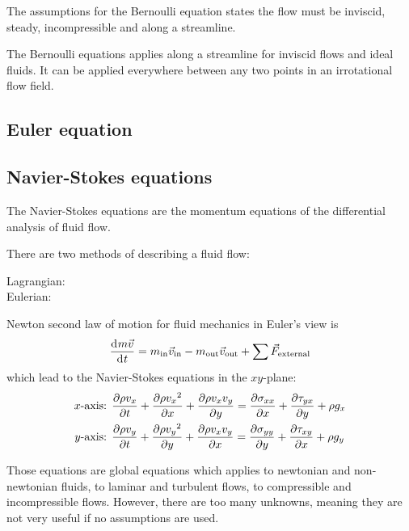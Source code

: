 \documentclass[10pt, twocolumn]{article}
\begin{document}
The assumptions for the Bernoulli equation states the flow must be inviscid, steady, incompressible and along a streamline.

The Bernoulli equations applies along a streamline for inviscid flows and ideal fluids.
It can be applied everywhere between any two points in an irrotational flow field.


\subsection{Euler equation}






\subsection{Navier-Stokes equations}
The Navier-Stokes equations are the momentum equations of the differential analysis of fluid flow.

There are two methods of describing a fluid flow:
\begin{description}
  \item[Lagrangian:]
  \item[Eulerian:]
\end{description}

Newton second law of motion for fluid mechanics in Euler's view is
\[
  \frac{\mathrm{d}^{} m\vec{v}}{\mathrm{d}^{} t} = m_\mathrm{in}\vec{v}_\mathrm{in} - m_\mathrm{out}\vec{v}_\mathrm{out} + \sum{\vec{F}_\mathrm{external}}
\]
which lead to the Navier-Stokes equations in the \(xy\)-plane:
\begin{align*}
  x \text{-axis: } & \frac{\partial \rho v_x}{\partial t} + \frac{\partial \rho {v_x}^2}{\partial x} + \frac{\partial \rho v_x v_y}{\partial y} = \frac{\partial \sigma_{xx}}{\partial x} +\frac{\partial \tau_{yx}}{\partial y} + \rho g_x \\
  y \text{-axis: } & \frac{\partial \rho v_y}{\partial t} + \frac{\partial \rho {v_y}^2}{\partial y} + \frac{\partial \rho v_x v_y}{\partial x} = \frac{\partial \sigma_{yy}}{\partial y} +\frac{\partial \tau_{xy}}{\partial x} + \rho g_y
\end{align*}

Those equations are global equations which applies to newtonian and non-newtonian fluids, to laminar and turbulent flows, to compressible and incompressible flows.
However, there are too many unknowns, meaning they are not very useful if no assumptions are used.
\end{document}
